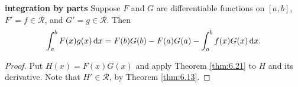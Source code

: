 \begin{thm}
    \label{thm:6.22}
    \textbf{integration by parts}
    Suppose $F$ and $G$ are differentiable functions on $[a,b]$,
    $F' = f \in \mathscr{R}$, and $G' = g \in \mathscr{R}$.
    Then 
    \begin{equation*}
        \int_{a}^{b} F(x)g(x) \d x = 
        F(b)G(b) - F(a)G(a) -
        \int_{a}^{b} f(x)G(x) \d x.
    \end{equation*}
\end{thm}

\begin{proof}
    Put $H(x) = F(x)G(x)$ and apply Theorem \ref{thm:6.21} to $H$
    and its derivative. 
    Note that $H' \in \mathscr{R}$, by Theorem \ref{thm:6.13}.
\end{proof}